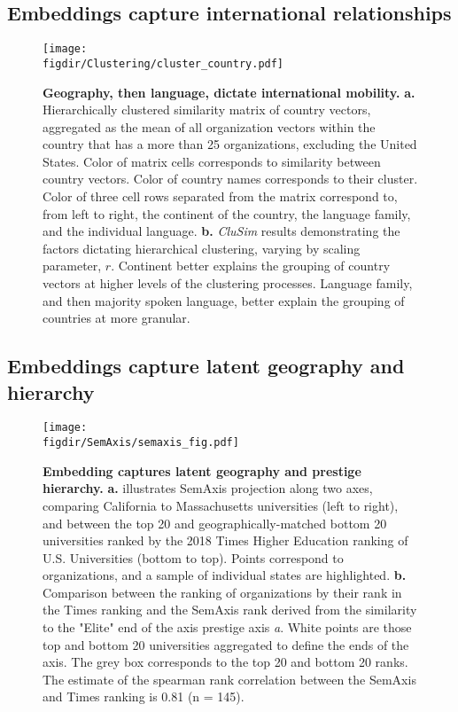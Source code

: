 \documentclass[12pt]{article} %
\def\figdir{../Figs}
\begin{document}
\subsection*{Embeddings capture international relationships}


%
%
\begin{figure}[p!]
	\centering
	\label{fig:clustering}
	\texttt{[image: \\figdir/Clustering/cluster\_country.pdf]}
	\caption{
		\textbf{Geography, then language, dictate international mobility.}
		\textbf{a.} Hierarchically clustered similarity matrix of country vectors, aggregated as the mean of all organization vectors within the country that has a more than 25 organizations, excluding the United States. 
		Color of matrix cells corresponds to similarity between country vectors.
		Color of country names corresponds to their cluster.
		Color of three cell rows separated from the matrix correspond to, from left to right, the continent of the country, the language family, and the individual language. 
		\textbf{b.}	\textit{CluSim} \cite{gates2019element} results demonstrating the factors dictating hierarchical clustering, varying by scaling parameter, $r$. 
		Continent better explains the grouping of country vectors at higher levels of the clustering processes.
		Language family, and then majority spoken language, better explain the grouping of countries at more granular. 
	}
\end{figure}


%
% 
\subsection*{Embeddings capture latent geography and hierarchy}
%
%
\begin{figure}[hp!]
	\centering
	\label{fig:semaxis}
	\texttt{[image: \\figdir/SemAxis/semaxis\_fig.pdf]}
	\caption{
		\textbf{Embedding captures latent geography and prestige hierarchy.}
		\textbf{a.} illustrates SemAxis projection along two axes, comparing California to Massachusetts universities (left to right), and between the top 20 and geographically-matched bottom 20 universities ranked by the 2018 Times Higher Education ranking of U.S. Universities (bottom to top). 
		Points correspond to organizations, and a sample of individual states are highlighted. 
		\textbf{b.} Comparison between the ranking of organizations by their rank in the Times ranking and the SemAxis rank derived from the similarity to the "Elite" end of the axis prestige axis \textit{a}.
		White points are those top and bottom 20 universities aggregated to define the ends of the axis. 
		The grey box corresponds to the top 20 and bottom 20 ranks. 
	  	The estimate of the spearman rank correlation between the SemAxis and Times ranking is 0.81 (n = 145).
	}
\end{figure}
\end{document}

